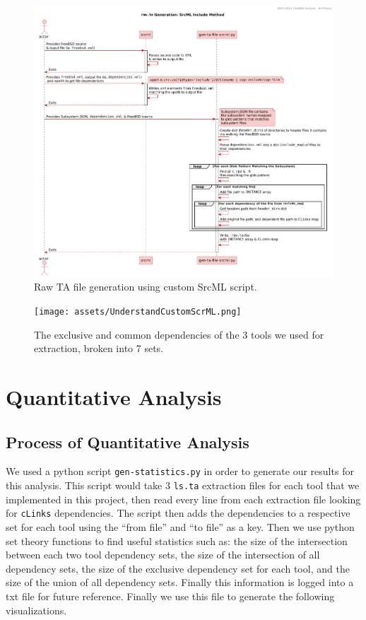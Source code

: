 \documentclass[12pt, dvipsnames, a4paper]{article}
\newcommand{\code}[1]{\texttt{#1}}
\begin{document}
\begin{figure}[!htb]
	\center
	\includegraphics[width = 450pt]{assets/sequence_diagrams/srcml_includes.pdf}
	\caption{Raw TA file generation using custom SrcML script.\cite{sourcecode}\cite{srcml}}
\end{figure}
\begin{figure}[H]
    \center
    \texttt{[image: assets/UnderstandCustomScrML.png]}
    \caption{The exclusive and common dependencies of the 3 tools we used for extraction, broken into 7 sets.}
\end{figure}

\section{Quantitative Analysis}
\subsection{Process of Quantitative Analysis}

We used a python script \code{gen-statistics.py} in order to generate our results for this analysis. This script would take 3 \code{ls.ta} extraction files for each tool that we implemented in this project, then read every line from each extraction file looking for \code{cLinks} dependencies. The script then adds the dependencies to a respective set for each tool using the “from file” and “to file” as a key. Then we use python set theory functions to find useful statistics such as: the size of the intersection between each two tool dependency sets, the size of the intersection of all dependency sets, the size of the exclusive dependency set for each tool, and the size of the union of all dependency sets. Finally this information is logged into a txt file for future reference. Finally we use this file to generate the following visualizations.
\end{document}

